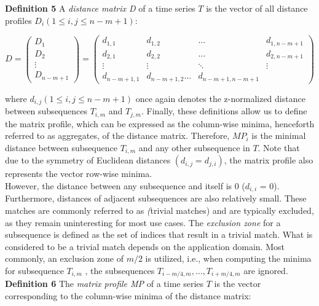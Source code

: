 \textbf{Definition 5} A \textit{distance matrix D} of a time series $T$ is the vector of all distance profiles \( D_i \left(1 \le i, j \le n - m + 1\right) \):

\[
    D =
    \begin{pmatrix}
        D_1\\
        D_2\\
        \vdots\\
        D_{n-m+1}
    \end{pmatrix}
    = 
    \begin{pmatrix}
        d_{1,1} & d_{1,2} & \dots & d_{1,n-m+1}\\
        d_{2,1} & d_{2,2} & \dots & d_{2,n-m+1}\\
        \vdots & \vdots & \ddots & \vdots\\
        d_{n-m+1,1} & d_{n-m+1,2} \dots & d_{n-m+1,n-m+1}
    \end{pmatrix}
\]

where \(d_{i,j} \left(1 \le i, j \le n - m + 1\right) \) once again denotes the z-normalized distance between subsequences $T_{i,m}$ and $T_{j,m}$. Finally, these definitions allow us to define the matrix profile, which can be expressed
as the column-wise minima, henceforth referred to as aggregates, of the distance matrix. Therefore, $MP_{i}$ is the minimal distance between subsequence $T_{i,m}$ and any other subsequence in $T$. Note that due to the symmetry of Euclidean distances \((d_{i,j} = d_{j,i} )\),
the matrix profile also represents the vector row-wise minima.\\

However, the distance between any subsequence and itself is 0 ($d_{i,i}$ = 0). Furthermore, distances of adjacent subsequences are also relatively small. These matches are
commonly referred to as \textit(trivial matches) and are typically excluded, as they remain uninteresting for most use cases. The \textit{exclusion zone} for a subsequence is defined as the set of indices that result in a trivial match. What is considered to be a trivial
match depends on the application domain. Most commonly, an exclusion zone of $m/2$ is utilized, i.e., when computing the minima for subsequence $T_{i,m}$ , the subsequences \( T_{i-m/4,m} ,\dots, T_{i+m/4,m} \) are ignored.\\

\textbf{Definition 6} The \textit{matrix profile MP} of a time series $T$ is the vector corresponding to the column-wise minima of the distance matrix:

